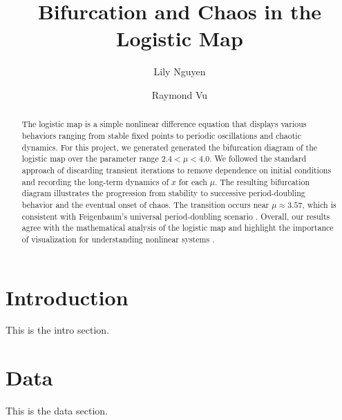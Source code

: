 \documentclass{aastex631}
\begin{document}
\title{Bifurcation and Chaos in the Logistic Map}
\author{Lily Nguyen}

\author{Raymond Vu}



\begin{abstract}
\noindent The logistic map is a simple nonlinear difference equation that displays
various behaviors ranging from stable fixed points to periodic oscillations
and chaotic dynamics. For this project, we generated generated the bifurcation
diagram of the logistic map over the parameter range $2.4< \mu < 4.0$. We
followed the standard approach of discarding transient iterations to remove
dependence on initial conditions and recording the long-term dynamics of $x$
for each $\mu$. The resulting bifurcation diagram illustrates the progression from
stability to successive period-doubling behavior and the eventual onset of
chaos. The transition occurs near $\mu\approx3.57$, which is consistent with
Feigenbaum's universal period-doubling scenario \cite{feigenbaum}. Overall, 
our results agree with the mathematical analysis of the logistic map 
\cite{bubolo} and highlight the importance of visualization for understanding
nonlinear systems \cite{boeing}.



\end{abstract}

\section{Introduction} \label{sec:intro}
This is the intro section.

\section{Data} \label{sec:data}
This is the data section.
\end{document}

